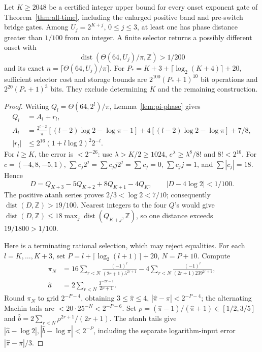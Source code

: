 \begin{theorem}
\label{thm:phase-selector}
Let $K\ge2048$ be a certified integer upper bound for every onset
exponent gate of Theorem~\ref{thm:all-time}, including the enlarged
positive band and pre-switch bridge gates. Among $U_j=2^{K+j}$,
$0\le j\le3$, at least one has phase distance greater than $1/100$
from an integer. A finite selector returns a possibly different onset with
\[
 \operatorname{dist}(\Theta(64,U_j)/\pi,\mathbb Z)>1/200
\]
and its exact $n=\lceil\Theta(64,U_j)/\pi\rceil$.
For $P_*=K+3+\lceil\log_2(K+4)\rceil+20$, sufficient selector
cost and storage bounds are $2^{100}(P_*+1)^{10}$ bit operations
and $2^{20}(P_*+1)^3$ bits. They exclude determining $K$ and the
remaining construction.
\end{theorem}
\begin{proof}
Writing $Q_l=\Theta(64,2^l)/\pi$, Lemma~\ref{lem:pi-phase} gives
\begin{align*}
 Q_l&=A_l+r_l,\\
 A_l&=\frac{2^{l-2}}\pi[(l-2)\log2-\log\pi-1]
                 +4[(l-2)\log2-\log\pi]+7/8,\\
 |r_l|&\le2^{16}(1+l\log2)^2 2^{-l}.
\end{align*}
For $l\ge K$, the error is $<2^{-26}$: use $\lambda>K/2\ge1024$,
$e^\lambda\ge\lambda^8/8!$ and $8!<2^{16}$.
For $c=(-4,8,-5,1)$,
$\sum c_j2^j=\sum c_jj2^j=\sum c_j=0$, $\sum c_jj=1$,
and $\sum|c_j|=18$. Hence
\[
 D=Q_{K+3}-5Q_{K+2}+8Q_{K+1}-4Q_K,
 \qquad |D-4\log2|<1/100.
\]
The positive atanh series proves $2/3<\log2<7/10$; consequently
$\operatorname{dist}(D,\mathbb Z)>19/100$. Nearest integers to
the four $Q$'s would give
$\operatorname{dist}(D,\mathbb Z)\le18\max_j
\operatorname{dist}(Q_{K+j},\mathbb Z)$, so one distance exceeds
$19/1800>1/100$.

Here is a terminating rational selection, which may reject equalities.
For each $l=K,\ldots,K+3$, set
$P=l+\lceil\log_2(l+1)\rceil+20$, $N=P+10$. Compute
\begin{align*}
 \pi_N&=16\sum_{r<N}\frac{(-1)^r}{(2r+1)5^{2r+1}}
         -4\sum_{r<N}\frac{(-1)^r}{(2r+1)239^{2r+1}},\\
 \widehat a&=2\sum_{r<N}\frac{3^{-2r-1}}{2r+1}.
\end{align*}
Round $\pi_N$ to grid $2^{-P-4}$, obtaining $3\le\widehat\pi\le4$,
$|\widehat\pi-\pi|<2^{-P-4}$; the alternating Machin tails are
$<20\cdot25^{-N}<2^{-P-6}$. Set
$\rho=(\widehat\pi-1)/(\widehat\pi+1)\in[1/2,3/5]$ and
$\widehat b=2\sum_{r<N}\rho^{2r+1}/(2r+1)$. The atanh tails
give $|\widehat a-\log2|,|\widehat b-\log\pi|<2^{-P}$,
including the separate logarithm-input error
$|\widehat\pi-\pi|/3$.


\end{proof}
